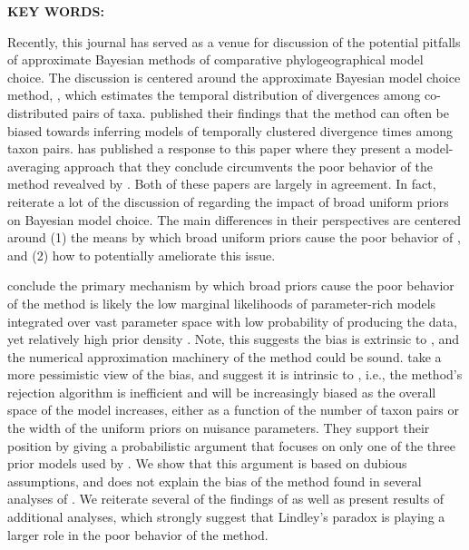 \documentclass[letterpaper,12pt]{article}
\begin{document}
\begin{linenumbers}
{    \vspace{12pt}
    \noindent\textbf{KEY WORDS: } 
}

\newpage
\noindent Recently, this journal has served as a venue for discussion of the
potential pitfalls of approximate Bayesian methods of comparative
phylogeographical model choice.
The discussion is centered around the approximate Bayesian model choice method,
\msb, which estimates the temporal distribution of divergences among
co-distributed pairs of taxa.
\citet{Oaks2012} published their findings that the method \msb can often be
biased towards inferring models of temporally clustered divergence times
among taxon pairs.
\citet{Hickerson2013} has published a response to this paper where they
present a model-averaging approach that they conclude circumvents the poor
behavior of the method revealved by \citet{Oaks2012}.
Both of these papers are largely in agreement.
In fact, \citet{Hickerson2013} reiterate a lot of the discussion of
\citet{Oaks2012} regarding the impact of broad uniform priors on Bayesian model
choice.
The main differences in their perspectives are centered around
(1) the means by which broad uniform priors cause the poor behavior of \msb,
and
(2) how to potentially ameliorate this issue.

\citet{Oaks2012} conclude the primary mechanism by which broad priors cause the
poor behavior of the method is likely the low marginal likelihoods of
parameter-rich models integrated over vast parameter space with low probability
of producing the data, yet relatively high prior density \citep[this is often
referred to as Lindley's paradox;][]{Lindley1957}.
Note, this suggests the bias is extrinsic to \msb, and the numerical
approximation machinery of the method could be sound.
\citet{Hickerson2013} take a more pessimistic view of the bias, and suggest it
is intrinsic to \msb, i.e., the method's rejection algorithm is
inefficient and will be increasingly biased as the overall space of the model
increases, either as a function of the number of taxon pairs or the width of
the uniform priors on nuisance parameters.
They support their position by giving a probabilistic argument that focuses on
only one of the three prior models used by \citet{Oaks2012}.
We show that this argument is based on dubious assumptions, and does not
explain the bias of the method found in several analyses of \citet{Oaks2012}.
We reiterate several of the findings of \citet{Oaks2012} as well as present
results of additional analyses, which strongly suggest that Lindley's paradox
is playing a larger role in the poor behavior of the method.


\end{linenumbers}
\end{document}

